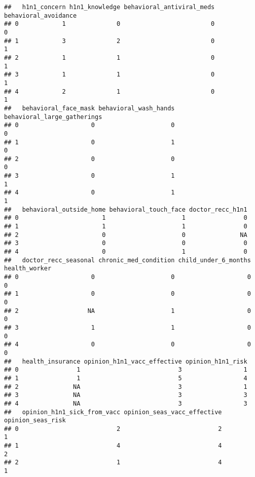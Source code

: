 \documentclass[
]{article}
\begin{document}
\begin{verbatim}
##   h1n1_concern h1n1_knowledge behavioral_antiviral_meds behavioral_avoidance
## 0            1              0                         0                    0
## 1            3              2                         0                    1
## 2            1              1                         0                    1
## 3            1              1                         0                    1
## 4            2              1                         0                    1
##   behavioral_face_mask behavioral_wash_hands behavioral_large_gatherings
## 0                    0                     0                           0
## 1                    0                     1                           0
## 2                    0                     0                           0
## 3                    0                     1                           1
## 4                    0                     1                           1
##   behavioral_outside_home behavioral_touch_face doctor_recc_h1n1
## 0                       1                     1                0
## 1                       1                     1                0
## 2                       0                     0               NA
## 3                       0                     0                0
## 4                       0                     1                0
##   doctor_recc_seasonal chronic_med_condition child_under_6_months health_worker
## 0                    0                     0                    0             0
## 1                    0                     0                    0             0
## 2                   NA                     1                    0             0
## 3                    1                     1                    0             0
## 4                    0                     0                    0             0
##   health_insurance opinion_h1n1_vacc_effective opinion_h1n1_risk
## 0                1                           3                 1
## 1                1                           5                 4
## 2               NA                           3                 1
## 3               NA                           3                 3
## 4               NA                           3                 3
##   opinion_h1n1_sick_from_vacc opinion_seas_vacc_effective opinion_seas_risk
## 0                           2                           2                 1
## 1                           4                           4                 2
## 2                           1                           4                 1

\end{verbatim}
\end{document}
